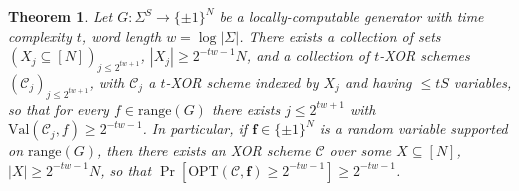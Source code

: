 \documentclass[11pt]{article}
\newtheorem{theorem}{Theorem}
\newcommand{\rng}{\mathrm{range}}
\newcommand{\Opt}{\mathrm{OPT}}
\newcommand{\N}{[N]}
\begin{document}
\begin{theorem}\label{thm:cell-csp}
Let $G: \Sigma^S \to \{\pm 1\}^{N}$ be a locally-computable generator with time complexity $t$, word length $w= \log |\Sigma|$. There exists a collection of sets $(X_j \subseteq \N)_{j \leq 2^{tw + 1}}$, $|X_j| \geq 2^{-tw-1}N$, and a collection of $t$-XOR schemes $(\mathcal{C}_j)_{j \leq 2^{tw + 1}}$, with $\mathcal{C}_j$ a $t$-XOR scheme indexed by $X_j$ and having $\leq tS$ variables, so that for every $f\in \rng(G)$ there exists $j \leq 2^{tw + 1}$ with $\mathrm{Val}(\mathcal{C}_j,f) \geq 2^{-tw-1}$.
In particular, if $\bm{f} \in \{\pm 1\}^N$ is a random variable supported on $\rng(G)$, then there exists an XOR scheme 
$\mathcal{C}$ over some $X \subseteq \N$, $|X| \geq 2^{-tw-1}N$, so that $\Pr[\Opt(\mathcal{C},\bm{f}) \geq 2^{-tw-1}] \geq 2^{-tw-1}$.
\end{theorem}
\end{document}
